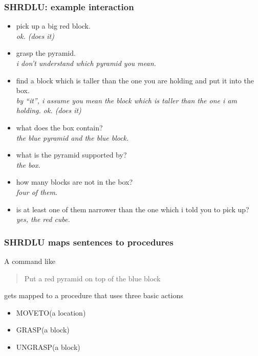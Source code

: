 \documentclass[ignorenonframetext]{beamer}
\begin{document}
\begin{frame}\frametitle{SHRDLU: example interaction}
\begin{itemize}
\item pick up a big red block. 
\\ {\sl ok. (does it) }
\item grasp the pyramid. 
\\ {\sl i don't understand which pyramid you mean. }
\item find a block which is taller than the one you are holding and put it into the box. 
\\ {\sl by ``it'', i assume you mean the block which is taller than the one i am holding.  ok. (does it) }
\item what does the box contain? 
\\ {\sl the blue pyramid and the blue block. }
\item what is the pyramid supported by? 
\\ {\sl the box. }
\item how many blocks are not in the box? 
\\ {\sl four of them. }
\item is at least one of them narrower than the one which i told you to pick up? 
\\ {\sl yes, the red cube. }
\end{itemize}
\end{frame}

\begin{frame}\frametitle{SHRDLU maps sentences to procedures}
A command like
\begin{quote}
Put a red pyramid on top of the blue block
\end{quote}
gets mapped to a procedure that uses three basic actions
\begin{itemize}
\item MOVETO(a location)
\item GRASP(a block)
\item UNGRASP(a block)
\end{itemize}
\end{frame}
\end{document}
